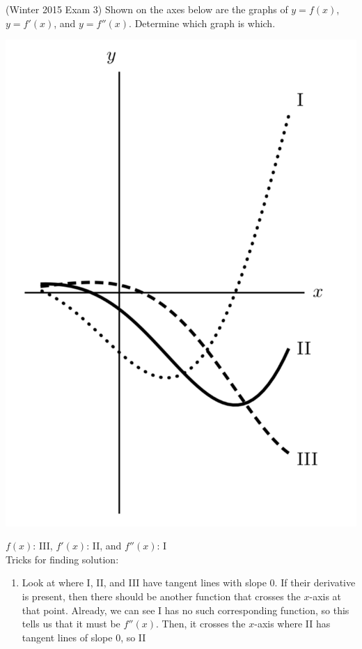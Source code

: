 \documentclass[11pt]{exam}
\begin{document}
\begin{questions}
\question (Winter 2015 Exam 3) 	Shown on the axes below are the graphs of $y = f(x)$, $y = f'(x)$, and $y = f''(x)$. Determine which graph is which.
  \begin{center}
    \includegraphics[scale=0.45]{match.png}
  \end{center}
  \begin{solution}
    \(f(x)\): III, \(f'(x)\): II, and \(f''(x)\): I\\
    Tricks for finding solution:
    \begin{enumerate}
    \item Look at where I, II, and III have tangent lines with slope
      \(0\). If their derivative is present, then there should be
      another function that crosses the \(x\)-axis at that
      point. Already, we can see I has no such corresponding function,
      so this tells us that it must be \(f''(x)\). Then, it crosses
      the \(x\)-axis where II has tangent lines of slope \(0\), so II

\end{enumerate}
\end{solution}
\end{questions}
\end{document}
